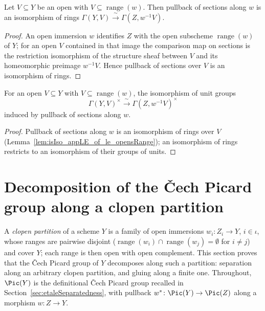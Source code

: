 \begin{lemma}
  \label{lem:isIso_appLE_of_le_opensRange}
  \leanok
  Let \(V \subseteq Y\) be an open with \(V \subseteq \operatorname{range}(w)\). Then pullback of
  sections along \(w\) is an isomorphism of rings
  \(\Gamma(Y, V) \xrightarrow{\ \sim\ } \Gamma(Z, w^{-1}V)\).
\end{lemma}
\begin{proof}
  \leanok
  An open immersion \(w\) identifies \(Z\) with the open subscheme \(\operatorname{range}(w)\) of
  \(Y\); for an open \(V\) contained in that image the comparison map on sections is the
  restriction isomorphism of the structure sheaf between \(V\) and its homeomorphic preimage
  \(w^{-1}V\). Hence pullback of sections over \(V\) is an isomorphism of rings.
\end{proof}

\begin{definition}
  \label{def:unitsPreimageEquiv}
  \leanok
  For an open \(V \subseteq Y\) with \(V \subseteq \operatorname{range}(w)\), the isomorphism of
  unit groups
  \[
    \Gamma(Y, V)^{\times} \xrightarrow{\ \sim\ } \Gamma(Z, w^{-1}V)^{\times}
  \]
  induced by pullback of sections along \(w\).
\end{definition}
\begin{proof}
  \leanok
  Pullback of sections along \(w\) is an isomorphism of rings over \(V\)
  (Lemma~\ref{lem:isIso_appLE_of_le_opensRange}); an isomorphism of rings restricts to an
  isomorphism of their groups of units.
\end{proof}

\section{Decomposition of the \v Cech Picard group along a clopen partition}

A \emph{clopen partition} of a scheme \(Y\) is a family of open immersions
\(w_i \colon Z_i \to Y\), \(i \in \iota\), whose ranges are pairwise disjoint
(\(\operatorname{range}(w_i) \cap \operatorname{range}(w_j) = \emptyset\) for \(i \ne j\)) and
cover \(Y\); each range is then open with open complement. This section proves that the \v Cech
Picard group of \(Y\) decomposes along such a partition: separation along an arbitrary clopen
partition, and gluing along a finite one. Throughout, \(\Pic(Y)\) is the definitional \v Cech
Picard group recalled in Section~\ref{sec:etaleSeparatedness}, with pullback
\(w^{*} \colon \Pic(Y) \to \Pic(Z)\) along a morphism \(w \colon Z \to Y\).

